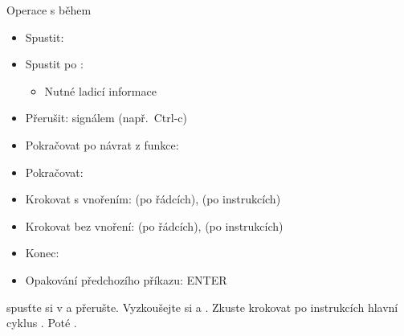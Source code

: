 \begin{frame}{Operace s během}

  \begin{itemize}
    \item Spustit: 
    \item Spustit po : 
    \begin{itemize}
      \item Nutné ladicí informace
    \end{itemize}

    \pause

    \item Přerušit: signálem (např.\ Ctrl-c)

    \pause

    \item Pokračovat po návrat z funkce: 
    \item Pokračovat: 

    \pause

    \item Krokovat s vnořením:  (po řádcích),  (po
      instrukcích)
    \item Krokovat bez vnoření:  (po řádcích),  (po
      instrukcích)

    \item Konec: 

    \medskip
    \pause

    \item Opakování předchozího příkazu: ENTER
  \end{itemize}

  \pause
  \medskip

   spusťte si  v  a přerušte. Vyzkoušejte si
   a . Zkuste krokovat po instrukcích hlavní cyklus
  . Poté .

\end{frame}

